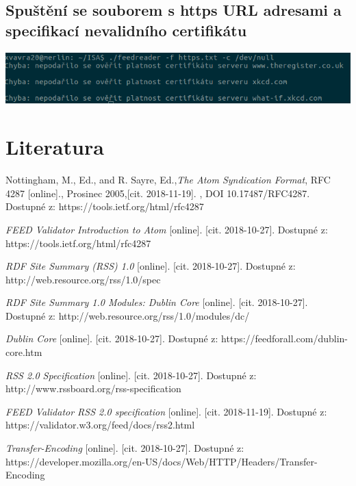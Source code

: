 \documentclass[11pt] {article}
\begin{document}
\subsection{Spuštění se souborem s https URL adresami a specifikací nevalidního certifikátu}
\includegraphics[scale=0.6]{feedreader4.png}
\newpage
\section{Literatura}
\begin{thebibliography}{9}

  Nottingham, M., Ed., and R. Sayre, Ed.,\emph{The Atom Syndication Format}, RFC 4287 [online]., Prosinec 2005,[cit. 2018-11-19]. , DOI 10.17487/RFC4287.
 Dostupné z: https://tools.ietf.org/html/rfc4287
  
  \emph{FEED Validator Introduction to Atom} [online]. 
  [cit. 2018-10-27]. 
  Dostupné z: https://tools.ietf.org/html/rfc4287

	  \emph{RDF Site Summary (RSS) 1.0} [online]. 
  [cit. 2018-10-27]. 
  Dostupné z: http://web.resource.org/rss/1.0/spec

	  \emph{RDF Site Summary 1.0 Modules: Dublin Core} [online]. 
  [cit. 2018-10-27]. 
  Dostupné z: http://web.resource.org/rss/1.0/modules/dc/
  
	  \emph{Dublin Core} [online]. 
  [cit. 2018-10-27]. 
  Dostupné z: https://feedforall.com/dublin-core.htm

	  \emph{RSS 2.0 Specification} [online]. 
  [cit. 2018-10-27]. 
  Dostupné z: http://www.rssboard.org/rss-specification
  
	  \emph{FEED Validator RSS 2.0 specification} [online]. 
  [cit. 2018-11-19]. 
  Dostupné z: https://validator.w3.org/feed/docs/rss2.html
  
	  \emph{Transfer-Encoding} [online]. 
  [cit. 2018-10-27]. 
  Dostupné z: https://developer.mozilla.org/en-US/docs/Web/HTTP/Headers/Transfer-Encoding
\end{thebibliography}
\end{document}
